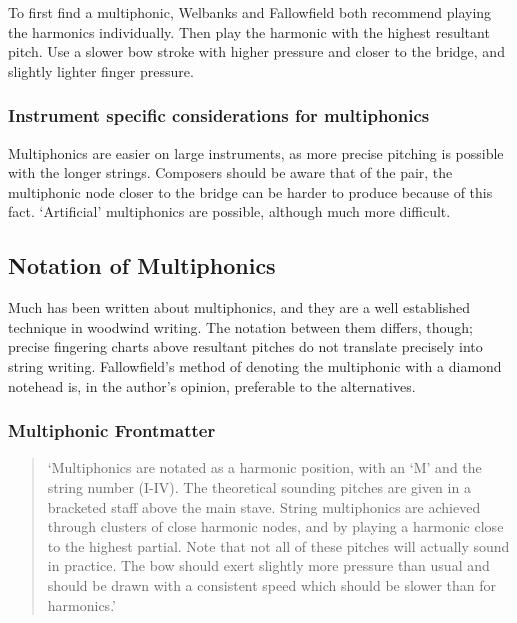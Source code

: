 To first find a multiphonic, Welbanks and Fallowfield both recommend playing the harmonics individually.\autocite[167]{welbanksFoundationsModernCello}
Then play the harmonic with the highest resultant pitch. 
Use a slower bow stroke with higher pressure and closer to the bridge, and slightly lighter finger pressure.


\subsubsection{Instrument specific considerations for multiphonics}
Multiphonics are easier on large instruments, as more precise pitching is possible with the longer strings.
Composers should be aware that of the pair, the multiphonic node closer to the bridge can be harder to produce because of this fact.
`Artificial' multiphonics are possible, although much more difficult.\autocite[772]{guettlerBowedstringMultiphonicsAnalyzed2012}

\subsection{Notation of Multiphonics}\label{sec:notation-multiphonics}
Much has been written about multiphonics, and they are a well established technique in woodwind writing.
The notation between them differs, though; precise fingering charts above resultant pitches do not translate precisely into string writing.
Fallowfield's method of denoting the multiphonic with a diamond notehead is, in the author's opinion, preferable to the alternatives.

\subsubsection{Multiphonic Frontmatter}\label{sec:multiphonicFrontmatter}
\begin{quotation}
  `Multiphonics are notated as a harmonic position, with an `M' and the string number (I-IV). 
  The theoretical sounding pitches are given in a bracketed staff above the main stave.
  String multiphonics are achieved through clusters of close harmonic nodes, and by playing a harmonic close to the highest partial.
  Note that not all of these pitches will actually sound in practice.
  The bow should exert slightly more pressure than usual and should be drawn with a consistent speed which should be slower than for harmonics.'
\end{quotation}


